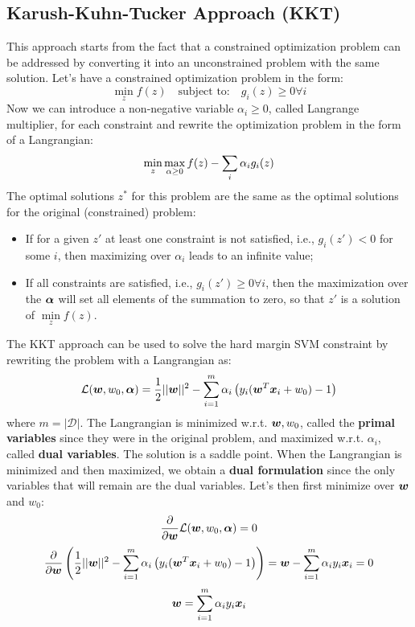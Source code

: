 \subsection{Karush-Kuhn-Tucker Approach (KKT)}
This approach starts from the fact that a constrained optimization problem can be addressed by converting it into an unconstrained problem with the same solution. \newline
Let's have a constrained optimization problem in the form:
\[\min\limits_zf(z)\quad\text{subject to:}\quad g_i(z)\geq 0\forall i\]
Now we can introduce a non-negative variable $\alpha_i\geq0$, called Langrange multiplier, for each constraint and rewrite the optimization problem in the form of a Langrangian:
\[\min\limits_z\max\limits_{\alpha\geq0}f(z)-\displaystyle\sum_i\alpha_ig_i(z)\]
The optimal solutions $z^*$ for this problem are the same as the optimal solutions for the original (constrained) problem:
\begin{itemize}
  \item If for a given $z'$ at least one constraint is not satisfied, i.e., $g_i(z')<0$ for some $i$, then maximizing over $\alpha_i$ leads to an infinite value;
  \item If all constraints are satisfied, i.e., $g_i(z')\geq0\forall i$, then the maximization over the $\bm{\alpha}$ will set all elements of the summation to zero, so that $z'$ is a solution of $\min\limits_zf(z)$.
\end{itemize}
The KKT approach can be used to solve the hard margin SVM constraint by rewriting the problem with a Langrangian as: 
\[\mathcal{L}(\bm{w},w_0,\bm{\alpha})=\frac{1}{2}\vert\vert\bm{w}\vert\vert^2-\displaystyle\sum_{i=1}^m\alpha_i\left(y_i(\bm{w}^T\bm{x}_i+w_0)-1\right)\]
where $m=\vert\mathcal{D}\vert$.
The Langrangian is minimized w.r.t. $\bm{w}, w_0$, called the \textbf{primal variables} since they were in the original problem, and maximized w.r.t. $\alpha_i$, called \textbf{dual variables}. The solution is a saddle point. When the Langrangian is minimized and then maximized, we obtain a \textbf{dual formulation} since the only variables that will remain are the dual variables. \newline
Let's then first minimize over $\bm{w}$ and $w_0$:
\[\frac{\partial}{\partial\bm{w}}\mathcal{L}(\bm{w},w_0,\bm{\alpha})=0\]
\[\frac{\partial}{\partial\bm{w}}\left(\frac{1}{2}\vert\vert\bm{w}\vert\vert^2-\displaystyle\sum_{i=1}^m\alpha_i\left(y_i(\bm{w}^T\bm{x}_i+w_0)-1\right)\right)=\bm{w}-\displaystyle\sum_{i=1}^m\alpha_iy_i\bm{x}_i=0\]
\begin{equation}
  \bm{w}=\displaystyle\sum_{i=1}^m\alpha_iy_i\bm{x}_i
  \label{eq:PrimalVariablew}
\end{equation}

